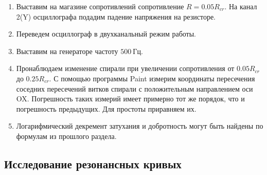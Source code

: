 \documentclass[14pt, a4paper]{report}
\begin{document}
\begin{enumerate}

\setcounter{enumi}{0}

\item Выставим на магазине сопротивлений сопротивление $R=0.05R_{cr}$. На канал 2(Y) осциллографа подадим падение напряжения на резисторе.

\item Переведем осциллограф в двухканальный режим работы.

\item Выставим на генераторе частоту $500\ Гц$.

\item Пронаблюдаем изменение спирали при увеличении сопротивления от $0.05R_{cr}$ до $0.25R_{cr}$. С помощью программы Paint измерим координаты пересечения соседних пересечений витков спирали с положительным направлением оси OX. Погрешность таких измерий имеет примерно тот же порядок, что и погрешность предыдущих. Для простоты приравняем их.

\item Логарифмический декремент затухания и добротность могут быть найдены по формулам из прошлого раздела.

\begin{table}[H]
\centering
{}
\caption{Результаты измерения координат пересечения соседних витков спирали}
\end{table}

\end{enumerate}

\subsection{Исследование резонансных кривых}
\end{document}
